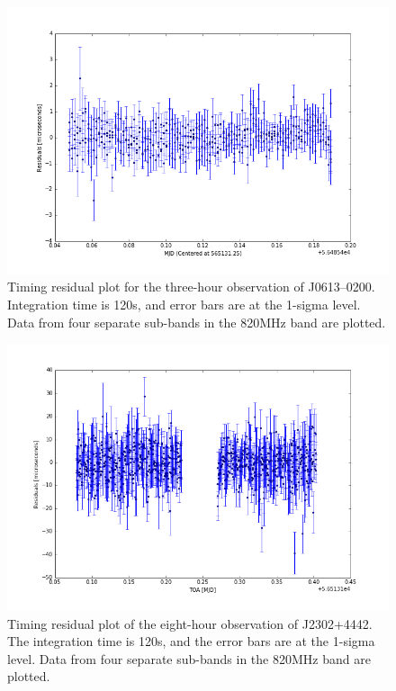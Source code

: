 \documentclass[12pt]{article}
\begin{document}
\begin{figure}[h!]
    \caption{Timing residual plot for the three-hour observation of J0613--0200.
Integration time is 120s, and error bars are at the 1-sigma level. Data from
four separate sub-bands in the 820MHz band are plotted.}
    \includegraphics[width=\textwidth]{./figures/J0613_residuals.png}
\end{figure}

\begin{figure}[h!]
    \caption{Timing residual plot of the eight-hour observation of J2302+4442. The
integration time is 120s, and the error bars are at the 1-sigma level. Data from
four separate sub-bands in the 820MHz band are plotted.}
    \includegraphics[width=\textwidth]{./figures/J2302_residuals.png}
\end{figure}
\end{document}
